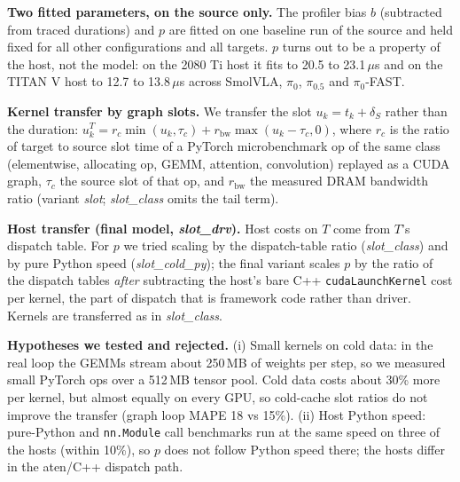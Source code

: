 \documentclass[10pt,twocolumn]{article}
\begin{document}
\textbf{Two fitted parameters, on the source only.} The profiler bias $b$ (subtracted from
traced durations) and $p$ are fitted on one baseline run of the source and held fixed for all
other configurations and all targets. $p$ turns out to be a property of the host, not the
model: on the 2080 Ti host it fits to 20.5 to 23.1\,$\mu$s and on the TITAN V host to 12.7 to
13.8\,$\mu$s across SmolVLA, $\pi_0$, $\pi_{0.5}$ and $\pi_0$-FAST.

\textbf{Kernel transfer by graph slots.} We transfer the slot $u_k = t_k + \delta_S$ rather
than the duration: $u_k^T = r_c \min(u_k, \tau_c) + r_{\mathrm{bw}}\max(u_k - \tau_c, 0)$,
where $r_c$ is the ratio of target to source slot time of a PyTorch microbenchmark op of the
same class (elementwise, allocating op, GEMM, attention, convolution) replayed as a CUDA graph,
$\tau_c$ the source slot of that op, and $r_{\mathrm{bw}}$ the measured DRAM bandwidth ratio
(variant \emph{slot}; \emph{slot\_class} omits the tail term).

\textbf{Host transfer (final model, \emph{slot\_drv}).} Host costs on $T$ come from $T$'s
dispatch table. For $p$ we tried scaling by the dispatch-table ratio (\emph{slot\_class}) and by
pure Python speed (\emph{slot\_cold\_py}); the final variant scales $p$ by the ratio of the
dispatch tables \emph{after} subtracting the host's bare C++ \texttt{cudaLaunchKernel} cost per
kernel, the part of dispatch that is framework code rather than driver. Kernels are transferred
as in \emph{slot\_class}.

\textbf{Hypotheses we tested and rejected.} (i) Small kernels on cold data: in the real loop
the GEMMs stream about 250\,MB of weights per step, so we measured small PyTorch ops over a
512\,MB tensor pool. Cold data costs about 30\% more per kernel, but almost equally on every
GPU, so cold-cache slot ratios do not improve the transfer (graph loop MAPE 18 vs 15\%).
(ii) Host Python speed: pure-Python and \texttt{nn.Module} call benchmarks run at the same
speed on three of the hosts (within 10\%), so $p$ does not follow Python speed there; the hosts
differ in the aten/C++ dispatch path.
\end{document}
